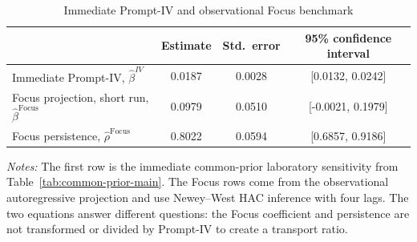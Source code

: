\begin{table}[htbp]
\color{revisionred}
\centering
\begin{threeparttable}
\caption{Immediate Prompt-IV and observational Focus benchmark}
\label{tab:summary_calibration}
\begin{footnotesize}
\begin{tabular}{lccc}
\toprule
 & Estimate & Std.\ error & 95\% confidence interval \\
\midrule
Immediate Prompt-IV, $\widehat{\beta}^{IV}$ & 0.0187 & 0.0028 & [0.0132, 0.0242] \\
Focus projection, short run, $\widehat{\beta}^{\mathrm{Focus}}$ & 0.0979 & 0.0510 & [-0.0021, 0.1979] \\
Focus persistence, $\widehat{\rho}^{\mathrm{Focus}}$ & 0.8022 & 0.0594 & [0.6857, 0.9186] \\
\bottomrule
\end{tabular}
\begin{tablenotes}[flushleft]
\scriptsize
\item \textit{Notes:} The first row is the immediate common-prior laboratory sensitivity from Table~\ref{tab:common-prior-main}. The Focus rows come from the observational autoregressive projection and use Newey--West HAC inference with four lags. The two equations answer different questions: the Focus coefficient and persistence are not transformed or divided by Prompt-IV to create a transport ratio.
\end{tablenotes}
\end{footnotesize}
\end{threeparttable}
\end{table}
